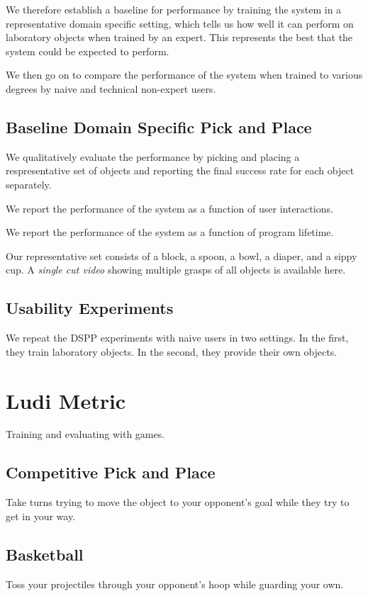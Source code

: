 \documentclass[conference]{IEEEtran}
\begin{document}
We therefore establish a baseline for performance by training the system in a representative domain
specific setting, which tells us how well it can perform on laboratory objects when trained by an 
expert. This represents the best that the system could be expected to perform.

We then go on to compare the performance of the system when trained to various degrees by naive
and technical non-expert users.

\subsection{Baseline Domain Specific Pick and Place}
We qualitatively evaluate the performance by picking and placing
a respresentative set of objects and reporting the final success rate for each 
object separately.

We report the performance of the system as a function of user interactions.

We report the performance of the system as a function of program lifetime.

Our representative set consists of a block, a spoon,
a bowl, a diaper, and a sippy cup. A \emph{single cut video} showing multiple grasps
of all objects is available here.

\subsection{Usability Experiments}
We repeat the DSPP experiments with naive users in two settings. In the first, they train laboratory
objects. In the second, they provide their own objects.

\section{Ludi Metric}
Training and evaluating with games.

\subsection{Competitive Pick and Place}
Take turns trying to move the object to your opponent's goal while they try to get in your way.

\subsection{Basketball}
Toss your projectiles through your opponent's hoop while guarding your own.
\end{document}
